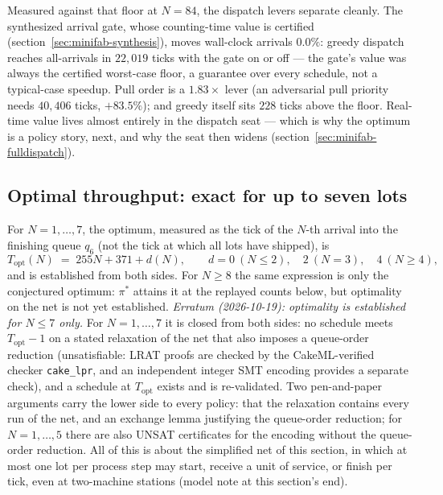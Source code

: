 Measured against that floor at $N = 84$, the dispatch levers
separate cleanly. The synthesized arrival gate, whose counting-time
value is certified (section~\ref{sec:minifab-synthesis}), moves
wall-clock arrivals $0.0\%$: greedy dispatch reaches all-arrivals
in $22{,}019$ ticks with the gate on or off --- the gate's value
was always the certified worst-case floor, a guarantee over every
schedule, not a typical-case speedup. Pull order is a $1.83\times$
lever (an adversarial pull priority needs $40{,}406$ ticks,
$+83.5\%$); and greedy itself sits $228$ ticks above the floor.
Real-time value lives almost entirely in the dispatch seat ---
which is why the optimum is a policy story, next, and why the seat
then widens (section~\ref{sec:minifab-fulldispatch}).

\subsection{Optimal throughput: exact for up to seven lots}
\label{sec:minifab-optimum}

For $N = 1, \dots, 7$, the optimum, measured as the tick of the
$N$-th arrival into the finishing queue $q_6$ (not the tick at which
all lots have shipped), is
\[
T_{\mathrm{opt}}(N) \;=\; 255N + 371 + d(N),
\qquad d = 0\ (N \le 2),\quad 2\ (N = 3),\quad 4\ (N \ge 4),
\]
and is established from both sides. For $N \ge 8$ the same expression
is only the conjectured optimum: $\pi^{\ast}$ attains it at the
replayed counts below, but optimality on the net is not yet
established.
\emph{Erratum (2026-10-19): optimality is established for $N \le 7$
only.} For $N = 1, \dots, 7$ it is closed from both sides: no schedule
meets $T_{\mathrm{opt}} - 1$ on a stated relaxation of the net that
also imposes a queue-order reduction (unsatisfiable: LRAT proofs are
checked by the CakeML-verified checker \texttt{cake\_lpr}, and an
independent integer SMT encoding provides a separate check), and a schedule at
$T_{\mathrm{opt}}$ exists and is re-validated. Two pen-and-paper
arguments carry the lower side to every policy: that the relaxation
contains every run of the net, and an exchange lemma justifying the
queue-order reduction; for $N=1,\dots,5$ there are also UNSAT
certificates for the encoding without the queue-order reduction. All
of this is about the simplified net of this section, in which at
most one lot per process step may start, receive a unit of service,
or finish per tick, even at two-machine stations (model note at this
section's end).

